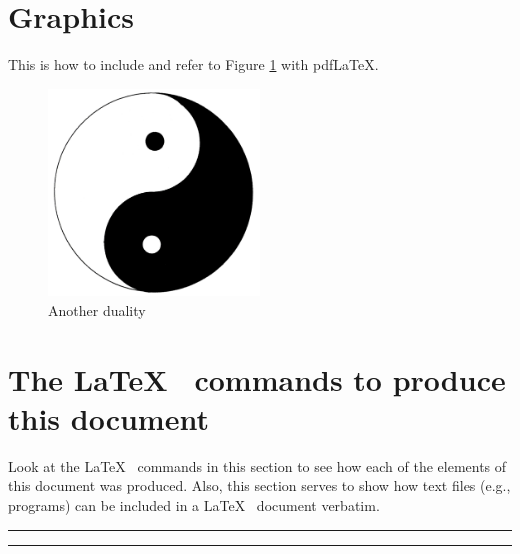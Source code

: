 \documentclass{amsart}
\theoremstyle{definition}
\theoremstyle{remark}
\numberwithin{equation}{section}
\begin{document}
\section{Graphics}

This is how to include and refer to Figure \ref{nameoffigure} with pdfLaTeX.

\begin{figure}[h!!]
\includegraphics[width=0.5\textwidth]{yinyang.jpg}
\caption{Another duality}\label{nameoffigure}
\end{figure}

\section{The \LaTeX~ commands to produce this document}
\label{sec:appendix}

Look at the \LaTeX~ commands in this section to see how each of the elements
of this document was produced. Also, this section serves to show
how text files (e.g., programs) can be included in a \LaTeX~ document verbatim.

\bigskip

\hrule

\small

\normalsize

\hrule

\bigskip

\end{document}
